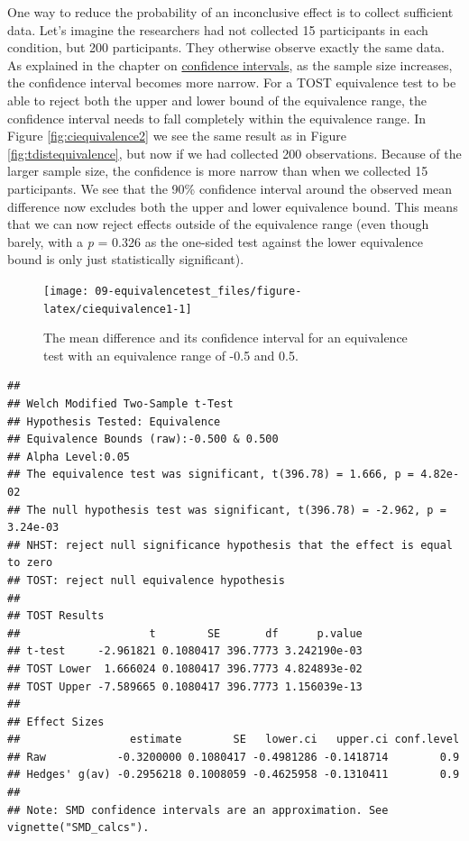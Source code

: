 \documentclass[
  oneside]{book}
\begin{document}
One way to reduce the probability of an inconclusive effect is to collect sufficient data. Let's imagine the researchers had not collected 15 participants in each condition, but 200 participants. They otherwise observe exactly the same data. As explained in the chapter on \protect\hyperlink{confint}{confidence intervals}, as the sample size increases, the confidence interval becomes more narrow. For a TOST equivalence test to be able to reject both the upper and lower bound of the equivalence range, the confidence interval needs to fall completely within the equivalence range. In Figure \ref{fig:ciequivalence2} we see the same result as in Figure \ref{fig:tdistequivalence}, but now if we had collected 200 observations. Because of the larger sample size, the confidence is more narrow than when we collected 15 participants. We see that the 90\% confidence interval around the observed mean difference now excludes both the upper and lower equivalence bound. This means that we can now reject effects outside of the equivalence range (even though barely, with a \emph{p} = 0.326 as the one-sided test against the lower equivalence bound is only just statistically significant).



\begin{figure}

{\centering \texttt{[image: 09-equivalencetest\_files/figure-latex/ciequivalence1-1]} 

}

\caption{The mean difference and its confidence interval for an equivalence test with an equivalence range of -0.5 and 0.5.}\label{fig:ciequivalence1}
\end{figure}

\begin{verbatim}
## 
## Welch Modified Two-Sample t-Test
## Hypothesis Tested: Equivalence
## Equivalence Bounds (raw):-0.500 & 0.500
## Alpha Level:0.05
## The equivalence test was significant, t(396.78) = 1.666, p = 4.82e-02
## The null hypothesis test was significant, t(396.78) = -2.962, p = 3.24e-03
## NHST: reject null significance hypothesis that the effect is equal to zero 
## TOST: reject null equivalence hypothesis
## 
## TOST Results 
##                    t        SE       df      p.value
## t-test     -2.961821 0.1080417 396.7773 3.242190e-03
## TOST Lower  1.666024 0.1080417 396.7773 4.824893e-02
## TOST Upper -7.589665 0.1080417 396.7773 1.156039e-13
## 
## Effect Sizes 
##                 estimate        SE   lower.ci   upper.ci conf.level
## Raw           -0.3200000 0.1080417 -0.4981286 -0.1418714        0.9
## Hedges' g(av) -0.2956218 0.1008059 -0.4625958 -0.1310411        0.9
## 
## Note: SMD confidence intervals are an approximation. See vignette("SMD_calcs").
\end{verbatim}
\end{document}
